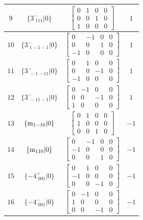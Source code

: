 \documentclass[fleqn,8pt]{jsarticle}
\begin{document}
\begin{longtable}{cccc}
$ 9 $ & $ \{3^{-}_{\,\,111}|0\} $ & $ \begin{bmatrix} 0 & 1 & 0 & 0 \\ 0 & 0 & 1 & 0 \\ 1 & 0 & 0 & 0 \end{bmatrix} $ & $ 1 $ \\ \hline
$ 10 $ & $ \{3^{-}_{\,\,1-1-1}|0\} $ & $ \begin{bmatrix} 0 & -1 & 0 & 0 \\ 0 & 0 & 1 & 0 \\ -1 & 0 & 0 & 0 \end{bmatrix} $ & $ 1 $ \\ \hline
$ 11 $ & $ \{3^{-}_{\,\,-1-11}|0\} $ & $ \begin{bmatrix} 0 & 1 & 0 & 0 \\ 0 & 0 & -1 & 0 \\ -1 & 0 & 0 & 0 \end{bmatrix} $ & $ 1 $ \\ \hline
$ 12 $ & $ \{3^{-}_{\,\,-11-1}|0\} $ & $ \begin{bmatrix} 0 & -1 & 0 & 0 \\ 0 & 0 & -1 & 0 \\ 1 & 0 & 0 & 0 \end{bmatrix} $ & $ 1 $ \\ \hline
$ 13 $ & $ \{{\rm m}_{1-10}|0\} $ & $ \begin{bmatrix} 0 & 1 & 0 & 0 \\ 1 & 0 & 0 & 0 \\ 0 & 0 & 1 & 0 \end{bmatrix} $ & $ -1 $ \\ \hline
$ 14 $ & $ \{{\rm m}_{110}|0\} $ & $ \begin{bmatrix} 0 & -1 & 0 & 0 \\ -1 & 0 & 0 & 0 \\ 0 & 0 & 1 & 0 \end{bmatrix} $ & $ -1 $ \\ \hline
$ 15 $ & $ \{-4^{+}_{\,\,001}|0\} $ & $ \begin{bmatrix} 0 & 1 & 0 & 0 \\ -1 & 0 & 0 & 0 \\ 0 & 0 & -1 & 0 \end{bmatrix} $ & $ -1 $ \\ \hline
$ 16 $ & $ \{-4^{-}_{\,\,001}|0\} $ & $ \begin{bmatrix} 0 & -1 & 0 & 0 \\ 1 & 0 & 0 & 0 \\ 0 & 0 & -1 & 0 \end{bmatrix} $ & $ -1 $ \\ \hline

\end{longtable}
\end{document}
